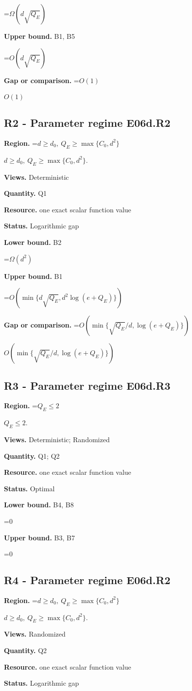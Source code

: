 \documentclass[10pt,a4paper]{article}
\newcommand{\AtlasMath}[1]{\par\begingroup\centering\setbox0=\hbox{$\displaystyle #1$}\ifdim\wd0>1.4\linewidth\typeout{ATLAS WIDE FORMULA: \the\wd0}\fi\ifdim\wd0>\linewidth\resizebox{\linewidth}{!}{\box0}\else\box0\fi\par\endgroup}
\newcommand{\AtlasInlineMath}[1]{\begingroup\setbox0=\hbox{$#1$}\ifdim\wd0>.4\linewidth\endgroup\AtlasMath{#1}\else\endgroup$#1$\fi}
\begin{document}
\AtlasMath{\Omega(d\sqrt{Q_E})}
\textbf{Upper bound.} B1, B5

\AtlasMath{O(d\sqrt{Q_E})}
\textbf{Gap or comparison.} \AtlasInlineMath{O(1)}

\subsection{R2 - Parameter regime E06d.R2}
\textbf{Region.} \AtlasInlineMath{d\ge d_0,\ Q_E\ge\max\{C_0,d^2\}}.

\textbf{Views.} Deterministic

\textbf{Quantity.} Q1

\textbf{Resource.} one exact scalar function value

\textbf{Status.} Logarithmic gap

\textbf{Lower bound.} B2

\AtlasMath{\Omega(d^2)}
\textbf{Upper bound.} B1

\AtlasMath{O(\min\{d\sqrt{Q_E},d^2\log(e+Q_E)\})}
\textbf{Gap or comparison.} \AtlasInlineMath{O(\min\{\sqrt{Q_E}/d,\log(e+Q_E)\})}

\subsection{R3 - Parameter regime E06d.R3}
\textbf{Region.} \AtlasInlineMath{Q_E\le 2}.

\textbf{Views.} Deterministic; Randomized

\textbf{Quantity.} Q1; Q2

\textbf{Resource.} one exact scalar function value

\textbf{Status.} Optimal

\textbf{Lower bound.} B4, B8

\AtlasMath{0}
\textbf{Upper bound.} B3, B7

\AtlasMath{0}
\subsection{R4 - Parameter regime E06d.R2}
\textbf{Region.} \AtlasInlineMath{d\ge d_0,\ Q_E\ge\max\{C_0,d^2\}}.

\textbf{Views.} Randomized

\textbf{Quantity.} Q2

\textbf{Resource.} one exact scalar function value

\textbf{Status.} Logarithmic gap
\end{document}

